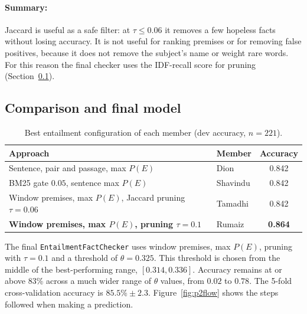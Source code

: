 \documentclass[12pt,a4paper]{article}
\begin{document}
\paragraph{Summary:} Jaccard is useful as a safe filter: at $\tau \le 0.06$ it removes a few hopeless facts without losing accuracy. It is not useful for ranking premises or for removing false positives, because it does not remove the subject's name or weight rare words. For this reason the final checker uses the IDF-recall score for pruning (Section~\ref{sec:p2final}).

\subsection{Comparison and final model}
\label{sec:p2final}

\begin{table}[H]
\centering
\begin{tabular}{llc}
\toprule
Approach & Member & Accuracy \\
\midrule
Sentence, pair and passage, max $P(E)$ & Dion & 0.842 \\
BM25 gate $0.05$, sentence max $P(E)$ & Shavindu & 0.842 \\
Window premises, max $P(E)$, Jaccard pruning $\tau=0.06$ & Tamadhi & 0.842 \\
\textbf{Window premises, max $P(E)$, pruning $\tau=0.1$} & Rumaiz & \textbf{0.864} \\
\bottomrule
\end{tabular}
\caption{Best entailment configuration of each member (dev accuracy, $n=221$).}
\label{tab:p2methods}
\end{table}

\noindent The final \texttt{EntailmentFactChecker} uses window premises, max $P(E)$, pruning with $\tau=0.1$ and a threshold of $\theta=0.325$. This threshold is chosen from the middle of the best-performing range, $[0.314, 0.336]$. Accuracy remains at or above 83\% across a much wider range of $\theta$ values, from $0.02$ to $0.78$. The 5-fold cross-validation accuracy is $85.5\% \pm 2.3$. Figure~\ref{fig:p2flow} shows the steps followed when making a prediction.
\end{document}
